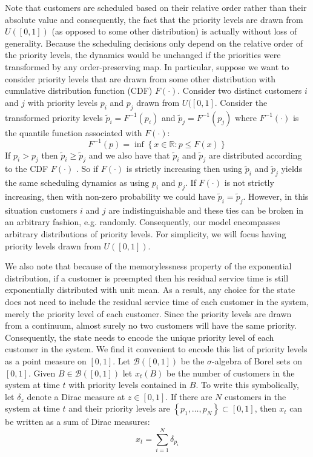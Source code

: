 \documentclass[conference]{IEEEtran}
\newcommand{\Rbb}{\mathbb{R}}
\newcommand{\Bcal}{\mathcal{B}}
\newcommand{\set}[1]{\left\{#1\right\}}
\begin{document}
Note that customers are scheduled based on their relative order rather
than their absolute value and consequently, the fact that the priority
levels are drawn from $U([0, 1])$ (as opposed to some other
distribution) is actually without loss of generality. Because the
scheduling decisions only depend on the relative order of the priority
levels, the dynamics would be unchanged if the priorities were
transformed by any order-preserving map. In particular, suppose we
want to consider priority levels that are drawn from some other
distribution with cumulative distribution function (CDF)
$F(\cdot)$. Consider two distinct customers $i$ and $j$ with priority
levels $p_i$ and $p_j$ drawn from $U([0,1]$. Consider the transformed
priority levels $\tilde p_i = F^{-1}(p_i)$ and $\tilde p_j =
F^{-1}(p_j)$ where $F^{-1}(\cdot)$ is the quantile function associated
with $F(\cdot)$:
\begin{equation}
  F^{-1}(p) = \inf \set{x \in \Rbb : p \leq F(x)}
\end{equation}
If $p_i > p_j$ then $\tilde p_i \geq \tilde p_j$ and we also have that
$\tilde p_i$ and $\tilde p_j$ are distributed according to the CDF
$F(\cdot)$ \cite[Theorem~2.1]{Devroye_1986}. So if $F(\cdot)$ is
strictly increasing then using $\tilde p_i$ and $\tilde p_j$ yields
the same scheduling dynamics as using $p_i$ and $p_j$. If $F(\cdot)$
is not strictly increasing, then with non-zero probability we could
have $\tilde p_i = \tilde p_j$. However, in this situation customers
$i$ and $j$ are indistinguishable and these ties can be broken in an
arbitrary fashion, e.g. randomly. Consequently, our model encompasses
arbitrary distributions of priority levels. For simplicity, we will
focus having priority levels drawn from $U([0, 1])$.

We also note that because of the memorylessness property of the
exponential distribution, if a customer is preempted then his residual
service time is still exponentially distributed with unit mean. As a
result, any choice for the state does not need to include the residual
service time of each customer in the system, merely the priority level
of each customer. Since the priority levels are drawn from a
continuum, almost surely no two customers will have the same priority.
Consequently, the state needs to encode the unique priority level of
each customer in the system. We find it convenient to encode this list
of priority levels as a point measure on $[0, 1]$. Let $\Bcal([0, 1])$
be the $\sigma$-algebra of Borel sets on $[0, 1]$. Given $B \in
\Bcal([0, 1])$ let $x_t(B)$ be the number of customers in the system
at time $t$ with priority levels contained in $B$. To write this
symbolically, let $\delta_z$ denote a Dirac measure at $z \in [0,
1]$. If there are $N$ customers in the system at time $t$ and their
priority levels are $\set{p_1, \hdots, p_N} \subset [0, 1]$, then
$x_t$ can be written as a sum of Dirac measures:
\begin{equation}
  x_t = \sum_{i=1}^N \delta_{p_i}
\end{equation}
\end{document}
